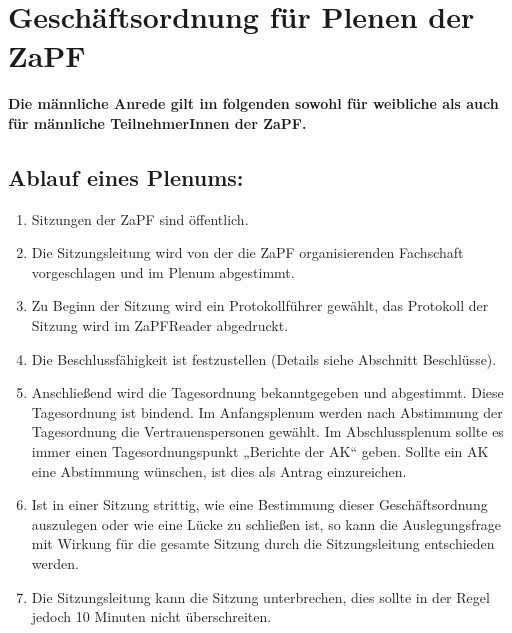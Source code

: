 \documentclass[draft,12pt,oneside]{scrreprt}
\begin{document}
\chapter*{Geschäftsordnung für Plenen der ZaPF}

\textbf{Die männliche Anrede gilt im folgenden sowohl für
weibliche als auch für männliche
 TeilnehmerInnen der ZaPF.}

\section{Ablauf eines Plenums:}

\begin{enumerate}
  \item Sitzungen der ZaPF sind öffentlich.
  \item Die Sitzungsleitung wird von der die ZaPF organisierenden Fachschaft vorgeschlagen und im Plenum abgestimmt.
  \item Zu Beginn der Sitzung wird ein Protokollführer gewählt, das Protokoll der Sitzung wird im ZaPFReader
        abgedruckt.
  \item Die Beschlussfähigkeit ist festzustellen (Details siehe Abschnitt Beschlüsse).
  \item Anschließend wird die Tagesordnung bekanntgegeben und abgestimmt. Diese Tagesordnung ist
        bindend. Im Anfangsplenum werden nach Abstimmung der Tagesordnung die Vertrauenspersonen gewählt.
        Im Abschlussplenum sollte es immer einen Tagesordnungspunkt „Berichte der AK“ geben.
        Sollte ein AK eine Abstimmung wünschen, ist dies als Antrag einzureichen.
  \item Ist in einer Sitzung strittig, wie eine Bestimmung dieser Geschäftsordnung auszulegen oder wie eine
        Lücke zu schließen ist, so kann die Auslegungsfrage mit Wirkung für die gesamte Sitzung durch die
        Sitzungsleitung entschieden werden.
  \item Die Sitzungsleitung kann die Sitzung unterbrechen, dies sollte in der Regel jedoch 10 Minuten nicht
        überschreiten.
\end{enumerate}

\noindent
\end{document}
